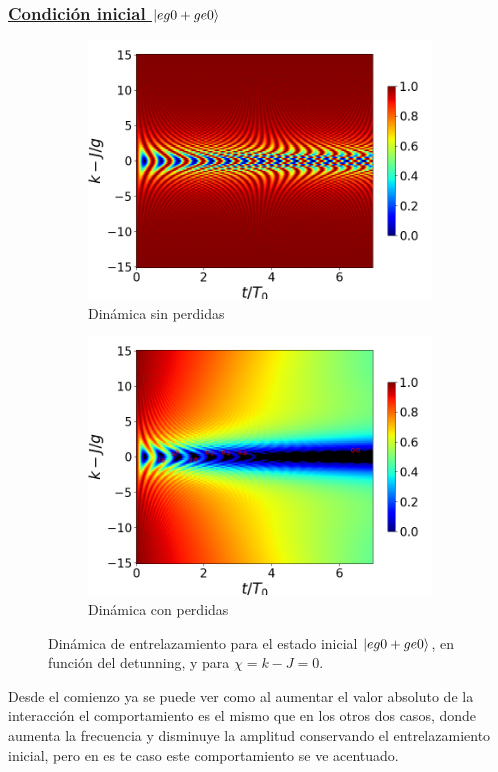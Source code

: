 \subsubsection{\underline{Condición inicial $\ket{eg0+ge0}$}}
\begin{figure}[h!]
    \centering
    \begin{subfigure}{0.49\textwidth}
        \includegraphics[width=\textwidth]{figuras/ch4/concu/k/eg0+ge0 d=0.0g x=0.0g J=15.0g gamma=0.25g concu k uni.png}
        \caption{Dinámica sin perdidas}
        \label{fig4:concu k 0 uni}
    \end{subfigure}
    \hfill
    \begin{subfigure}{0.49\textwidth}
        \includegraphics[width=\textwidth]{figuras/ch4/concu/k/eg0+ge0 d=0.0g x=0.0g J=15.0g gamma=0.25g concu k dis.png}
        \caption{Dinámica con perdidas}
        \label{fig4:concu k 0 dis}
    \end{subfigure}
    \caption{Dinámica de entrelazamiento para el estado inicial $\ket{eg0+ge0}$, en función del detunning, y para $\chi=k-J=0$.}
    \label{fig4:concu k 0}
\end{figure}
Desde el comienzo ya se puede ver como al aumentar el valor absoluto de la interacción el comportamiento es el mismo que en los otros dos casos, donde aumenta la frecuencia y disminuye la amplitud conservando el entrelazamiento inicial, pero en es te caso este comportamiento se ve acentuado. 


